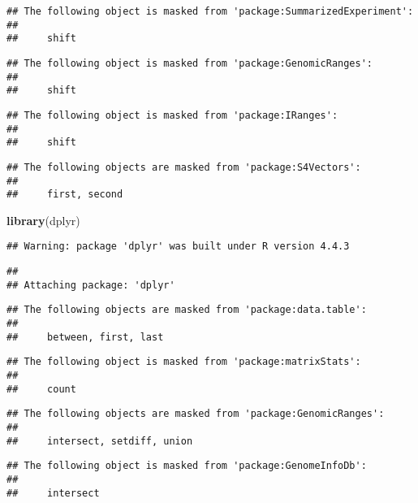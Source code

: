\documentclass[
]{article}
\newenvironment{Shaded}{\begin{snugshade}}{\end{snugshade}}
\newcommand{\FunctionTok}[1]{\textcolor[rgb]{0.13,0.29,0.53}{\textbf{#1}}}
\newcommand{\NormalTok}[1]{#1}
\begin{document}
\begin{verbatim}
## The following object is masked from 'package:SummarizedExperiment':
## 
##     shift
\end{verbatim}

\begin{verbatim}
## The following object is masked from 'package:GenomicRanges':
## 
##     shift
\end{verbatim}

\begin{verbatim}
## The following object is masked from 'package:IRanges':
## 
##     shift
\end{verbatim}

\begin{verbatim}
## The following objects are masked from 'package:S4Vectors':
## 
##     first, second
\end{verbatim}

\begin{Shaded}
\begin{Highlighting}[]
\FunctionTok{library}\NormalTok{(dplyr)}
\end{Highlighting}
\end{Shaded}

\begin{verbatim}
## Warning: package 'dplyr' was built under R version 4.4.3
\end{verbatim}

\begin{verbatim}
## 
## Attaching package: 'dplyr'
\end{verbatim}

\begin{verbatim}
## The following objects are masked from 'package:data.table':
## 
##     between, first, last
\end{verbatim}

\begin{verbatim}
## The following object is masked from 'package:matrixStats':
## 
##     count
\end{verbatim}

\begin{verbatim}
## The following objects are masked from 'package:GenomicRanges':
## 
##     intersect, setdiff, union
\end{verbatim}

\begin{verbatim}
## The following object is masked from 'package:GenomeInfoDb':
## 
##     intersect
\end{verbatim}
\end{document}
